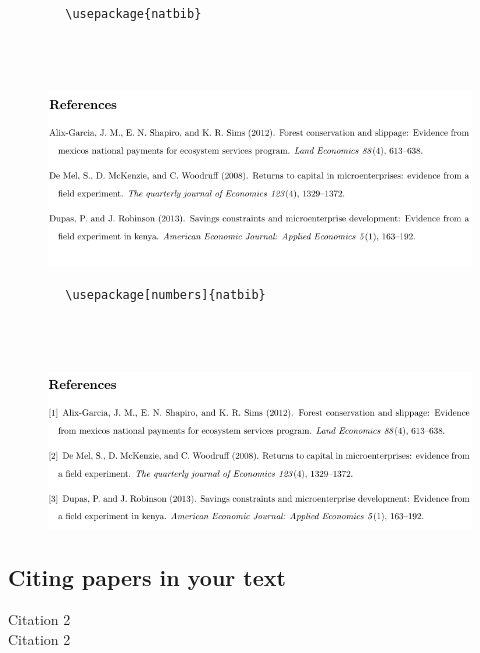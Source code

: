 \documentclass[12pts]{article}
\begin{document}
	\begin{verbatim}
		\usepackage{natbib}
		
	\end{verbatim}
	
	\begin{verbatim}
		
	\end{verbatim}
	
	\begin{figure}[H]
		\centering
		\includegraphics[width=\linewidth]{../img/Chicago}
	\end{figure}

	\begin{verbatim}
		\usepackage[numbers]{natbib}
		
	\end{verbatim}
	
	\begin{verbatim}
		
	\end{verbatim}
	
	\begin{figure}[H]
		\centering
		\includegraphics[width=\linewidth]{../img/Chicago_numbers}
	\end{figure}
	
	
	\subsection{Citing papers in your text}
	
	Citation 2 \citet{dupas2013savings} \\
	Citation 2 \citep{dupas2013savings} \\
	
\end{document}
